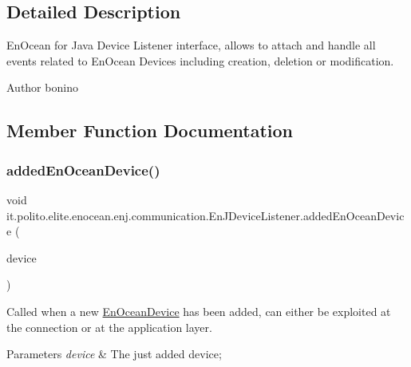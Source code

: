 \subsection{Detailed Description}
En\+Ocean for Java Device Listener interface, allows to attach and handle all events related to En\+Ocean Devices including creation, deletion or modification.

\begin{DoxyAuthor}{Author}
bonino 
\end{DoxyAuthor}


\subsection{Member Function Documentation}
\hypertarget{interfaceit_1_1polito_1_1elite_1_1enocean_1_1enj_1_1communication_1_1_en_j_device_listener_a4d573c1f79d5f174ad22f8ce999c972d}{}\label{interfaceit_1_1polito_1_1elite_1_1enocean_1_1enj_1_1communication_1_1_en_j_device_listener_a4d573c1f79d5f174ad22f8ce999c972d} 
\subsubsection{\texorpdfstring{added\+En\+Ocean\+Device()}{addedEnOceanDevice()}}
{\footnotesize\ttfamily void it.\+polito.\+elite.\+enocean.\+enj.\+communication.\+En\+J\+Device\+Listener.\+added\+En\+Ocean\+Device (\begin{DoxyParamCaption}\item[{\hyperlink{classit_1_1polito_1_1elite_1_1enocean_1_1enj_1_1model_1_1_en_ocean_device}{En\+Ocean\+Device}}]{device }\end{DoxyParamCaption})}

Called when a new \hyperlink{}{En\+Ocean\+Device} has been added, can either be exploited at the connection or at the application layer.


\begin{DoxyParams}{Parameters}
{\em device} & The just added device; \\
\hline
\end{DoxyParams}


